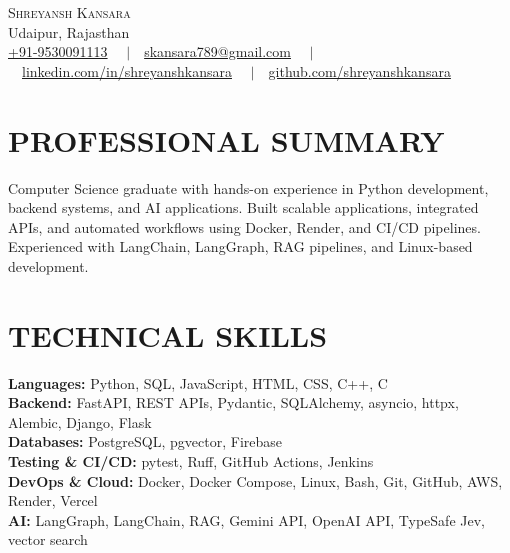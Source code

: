 \documentclass[letterpaper,10pt]{article}
\begin{document}
\begin{center}
  {\Huge \scshape Shreyansh Kansara} \\ \vspace{1pt}
  \vspace{2pt}
  \small Udaipur, Rajasthan \\ \vspace{1pt}
  \small \href{tel:+919530091113}{+91-9530091113} \ \ $|$\ \ 
  \href{mailto:skansara789@gmail.com}{skansara789@gmail.com} \ \ $|$\ \ 
  \href{https://linkedin.com/in/shreyanshkansara}{linkedin.com/in/shreyanshkansara} \ \ $|$\ \ 
  \href{https://github.com/shreyanshkansara}{github.com/shreyanshkansara}
\end{center}
\vspace{-8pt}

\section{PROFESSIONAL SUMMARY}
\small{Computer Science graduate with hands-on experience in Python development, backend systems, and AI applications. Built scalable applications, integrated APIs, and automated workflows using Docker, Render, and CI/CD pipelines. Experienced with LangChain, LangGraph, RAG pipelines, and Linux-based development.}

\section{TECHNICAL SKILLS}
\begin{itemize}[leftmargin=0.15in, label={}]
  \small{\item{
    \textbf{Languages:} Python, SQL, JavaScript, HTML, CSS, C++, C \\
    \textbf{Backend:} FastAPI, REST APIs, Pydantic, SQLAlchemy, asyncio, httpx, Alembic, Django, Flask \\
    \textbf{Databases:} PostgreSQL, pgvector, Firebase \\
    \textbf{Testing \& CI/CD:} pytest, Ruff, GitHub Actions, Jenkins \\
    \textbf{DevOps \& Cloud:} Docker, Docker Compose, Linux, Bash, Git, GitHub, AWS, Render, Vercel \\
    \textbf{AI:} LangGraph, LangChain, RAG, Gemini API, OpenAI API, TypeSafe Jev, vector search
  }}
\end{itemize}
\end{document}
